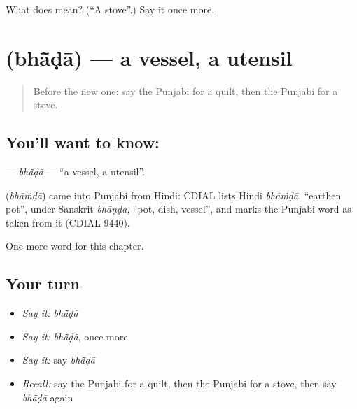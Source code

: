 \begin{tcolorbox}[breakable,colback=teal!4,colframe=teal!35!black,title={Before you move on}]
What does  mean? (\textquotedblleft{}A stove\textquotedblright{}.) Say it once more.
\end{tcolorbox}
\section[\texorpdfstring{\pa{ਭਾਂਡਾ} (bhā̃ḍā)}{ਭਾਂਡਾ (bhā̃ḍā)}]{ (bhā̃ḍā) — a vessel, a utensil}

\label{lesson:PA-C115-bhada}



\begin{quote}
Before the new one: say the Punjabi for a quilt, then the Punjabi for a stove.
\end{quote}

\subsection*{You'll want to know: }
\textbf{} — \emph{bhā̃ḍā} — \textquotedblleft{}a vessel, a utensil\textquotedblright{}.

\begin{cousinweb}
\textbf{} (\emph{bhāṁḍā}) came into Punjabi from Hindi: CDIAL lists Hindi \emph{bhāṁḍā}, \textquotedblleft{}earthen pot\textquotedblright{}, under Sanskrit \emph{bhāṇḍa}, \textquotedblleft{}pot, dish, vessel\textquotedblright{}, and marks the Punjabi word as taken from it (CDIAL 9440).
\end{cousinweb}

\begin{grammarlens}[title={What you've built}]
One more word for this chapter.
\end{grammarlens}

\subsection*{Your turn}
\begin{itemize}
\raggedright
  \item \emph{Say it:} \emph{bhā̃ḍā}
  \item \emph{Say it:} \emph{bhā̃ḍā}, once more
  \item \emph{Say it:} say \emph{bhā̃ḍā}
  \item \emph{Recall:} say the Punjabi for a quilt, then the Punjabi for a stove, then say \emph{bhā̃ḍā} again
\end{itemize}

